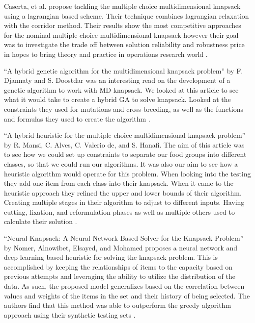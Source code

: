 \documentclass[10pt,journal,compsoc]{IEEEtran}
\begin{document}
Caserta, et al. propose tackling the multiple choice multidimensional knapsack
using a lagrangian based scheme. Their technique combines lagrangian relaxation
with the corridor method. Their results show the most competitive approaches for
the nominal multiple choice multidimensional knapsack however their goal was to
investigate the trade off between solution reliability and robustness price in
hopes to bring theory and practice in operations research world
\cite{caserta_robust_2019}.

“A hybrid genetic algorithm for the multidimensional knapsack problem” by F.
Djannaty and S. Doostdar was an interesting read on the development of a genetic
algorithm to work with MD knapsack. We looked at this article to see what it
would take to create a hybrid GA to solve knapsack. Looked at the constraints
they used for mutations and cross-breeding, as well as the functions and
formulas they used to create the algorithm \cite{djannaty_hybrid_2008}. 

“A hybrid heuristic for the multiple choice multidimensional knapsack problem”
by R. Mansi, C. Alves, C. Valerio de, and S. Hanafi.  The aim of this article
was to see how we could set up constraints to separate our food groups into
different classes, so that we could run our algorithms. It was also our aim to
see how a heuristic algorithm would operate for this problem. When looking into
the testing they add one item from each class into their knapsack. When it came
to the heuristic approach they refined the upper and lower bounds of their
algorithm. Creating multiple stages in their algorithm to adjust to different
inputs. Having cutting, fixation, and reformulation phases as well as multiple
others used to calculate their solution \cite{mansi_hybrid_2013}.

“Neural Knapsack: A Neural Network Based Solver for the Knapsack Problem'' by
Nomer, Alnowibet, Elsayed, and Mohamed proposes a neural network and deep
learning based heuristic for solving the knapsack problem. This is accomplished
by keeping the relationships of items to the capacity based on previous attempts
and leveraging the ability to utilize the distribution of the data. As such, the
proposed model generalizes based on the correlation between values and weights
of the items in the set and their history of being selected. The authors find
that this method was able to outperform the greedy algorithm approach using
their synthetic testing sets \cite{nomer_neural_2020}.
\end{document}
